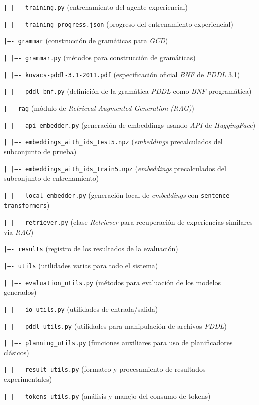 \begin{anexes}
\texttt{|   |---- training.py} (entrenamiento del agente experiencial)

\texttt{|   |---- training\_progress.json} (progreso del entrenamiento experiencial)

\texttt{|---- grammar} (construcción de gramáticas para \textit{GCD})

\texttt{|   |---- grammar.py} (métodos para construcción de gramáticas)

\texttt{|   |---- kovacs-pddl-3.1-2011.pdf} (especificación oficial \textit{BNF} de \textit{PDDL} 3.1)

\texttt{|   |---- pddl\_bnf.py} (definición de la gramática \textit{PDDL} como \textit{BNF} programática)

\texttt{|---- rag} (módulo de \textit{Retrieval-Augmented Generation (RAG)})

\texttt{|   |---- api\_embedder.py} (generación de embeddings usando \textit{API} de \textit{HuggingFace})

\texttt{|   |---- embeddings\_with\_ids\_test5.npz} (\textit{embeddings} precalculados del subconjunto de prueba)

\texttt{|   |---- embeddings\_with\_ids\_train5.npz} (\textit{embeddings} precalculados del subconjunto de entrenamiento)

\texttt{|   |---- local\_embedder.py} (generación local de \textit{embeddings} con \texttt{sentence-transformers})

\texttt{|   |---- retriever.py} (clase \textit{Retriever} para recuperación de experiencias similares via \textit{RAG})

\texttt{|---- results} (registro de los resultados de la evaluación)

\texttt{|---- utils} (utilidades varias para todo el sistema)

\texttt{|   |---- evaluation\_utils.py} (métodos para evaluación de los modelos generados)

\texttt{|   |---- io\_utils.py} (utilidades de entrada/salida)

\texttt{|   |---- pddl\_utils.py} (utilidades para manipulación de archivos \textit{PDDL})

\texttt{|   |---- planning\_utils.py} (funciones auxiliares para uso de planificadores clásicos)

\texttt{|   |---- result\_utils.py} (formateo y procesamiento de resultados experimentales)

\texttt{|   |---- tokens\_utils.py} (análisis y manejo del consumo de tokens)


\end{anexes}
